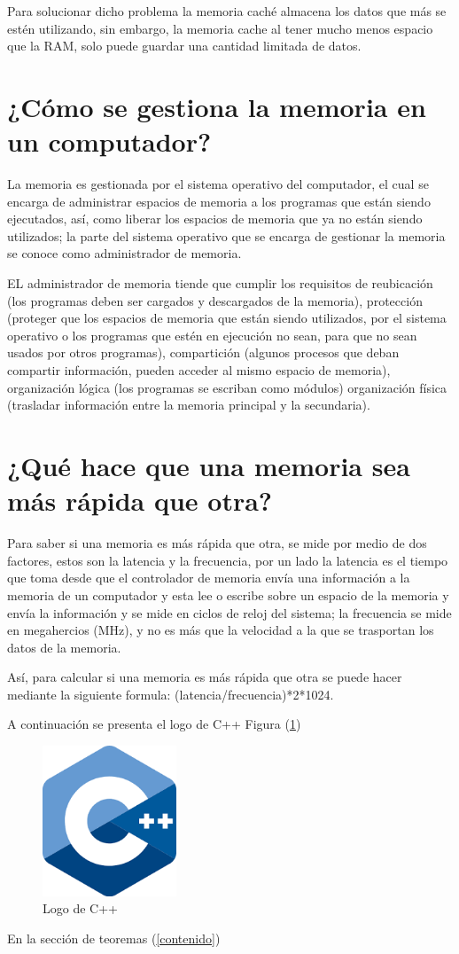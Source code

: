 \documentclass{article}
\begin{document}
Para solucionar dicho problema la memoria caché almacena los datos que más se estén utilizando, sin embargo, la memoria cache al tener mucho menos espacio que la RAM, solo puede guardar una cantidad limitada de datos.\cite{Salazar}

\section{¿Cómo se gestiona la memoria en un computador?}
La memoria es gestionada por el sistema operativo del computador, el cual se encarga de administrar espacios de memoria a los programas que están siendo ejecutados, así, como liberar los espacios de memoria que ya no están siendo utilizados; la parte del sistema operativo que se encarga de gestionar la memoria se conoce como administrador de memoria.
\vspace{0.5cm}

EL administrador de memoria tiende que cumplir los requisitos de reubicación (los programas deben ser cargados y descargados de la memoria), protección (proteger que los espacios de memoria que están siendo utilizados, por el sistema operativo o los programas que estén en ejecución no sean, para que no sean usados por otros programas), compartición (algunos procesos que deban compartir información, pueden acceder al mismo espacio de memoria), organización lógica (los programas se escriban como módulos) organización física (trasladar información entre la memoria principal y la secundaria).\cite{aguilera2015sistemas} 

\section{¿Qué hace que una memoria sea más rápida que otra?}
Para saber si una memoria es más rápida que otra, se mide por medio de dos factores, estos son la latencia y la frecuencia, por un lado la latencia es el tiempo que toma desde que el controlador de memoria envía una información  a la memoria de un computador y esta lee o escribe sobre un espacio de la memoria y envía la información y se mide en ciclos de reloj del sistema\cite{Salazar}; la frecuencia se mide en megahercios (MHz), y no es más que la velocidad a la que se trasportan los datos de la memoria.\cite{computerhoy}
\vspace{0.5cm}

Así, para calcular si una memoria es más rápida que otra se puede hacer mediante la siguiente formula: (latencia/frecuencia)*2*1024.\cite{computerhoy}


A continuación se presenta el logo de C++ Figura (\ref{fig:cpplogo})
\begin{figure}[h]
\includegraphics[width=4cm]{cpplogo.png}
\centering
\caption{Logo de C++}
\label{fig:cpplogo}
\end{figure}

En la sección de teoremas (\ref{contenido})



\end{document}
